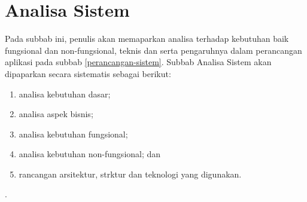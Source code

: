 \section{Analisa Sistem}
	Pada subbab ini, penulis akan memaparkan analisa terhadap kebutuhan baik fungsional dan non-fungsional, teknis dan serta pengaruhnya dalam perancangan aplikasi pada subbab \ref{perancangan-sistem}. Subbab Analisa Sistem akan dipaparkan secara sistematis sebagai berikut:
	\begin{enumerate}[label=\alph*.]
		\item analisa kebutuhan dasar;
		\item analisa aspek bisnis;
		\item analisa kebutuhan fungsional;
		\item analisa kebutuhan non-fungsional; dan
		\item rancangan arsitektur, strktur dan teknologi yang digunakan.
	\end{enumerate}.
	
	
	
	
	
	
	
	
	
